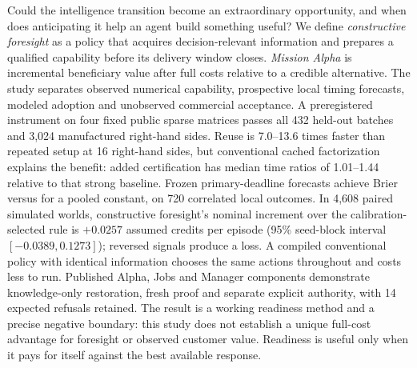 Could the intelligence transition become an extraordinary opportunity, and when does anticipating it help an agent build something useful? We define \emph{constructive foresight} as a policy that acquires decision-relevant information and prepares a qualified capability before its delivery window closes. \emph{Mission Alpha} is incremental beneficiary value after full costs relative to a credible alternative. The study separates observed numerical capability, prospective local timing forecasts, modeled adoption and unobserved commercial acceptance. A preregistered instrument on four fixed public sparse matrices passes all 432 held-out batches and 3,024 manufactured right-hand sides. Reuse is 7.0--13.6 times faster than repeated setup at 16 right-hand sides, but conventional cached factorization explains the benefit: added certification has median time ratios of 1.01--1.44 relative to that strong baseline. Frozen primary-deadline forecasts achieve Brier \PrimaryBrier{} versus \BaseBrier{} for a pooled constant, on 720 correlated local outcomes. In 4,608 paired simulated worlds, constructive foresight's nominal increment over the calibration-selected rule is $+0.0257$ assumed credits per episode (95\% seed-block interval $[-0.0389,0.1273]$); reversed signals produce a loss. A compiled conventional policy with identical information chooses the same actions throughout and costs less to run. Published Alpha, Jobs and Manager components demonstrate knowledge-only restoration, fresh proof and separate explicit authority, with 14 expected refusals retained. The result is a working readiness method and a precise negative boundary: this study does not establish a unique full-cost advantage for foresight or observed customer value. Readiness is useful only when it pays for itself against the best available response.
